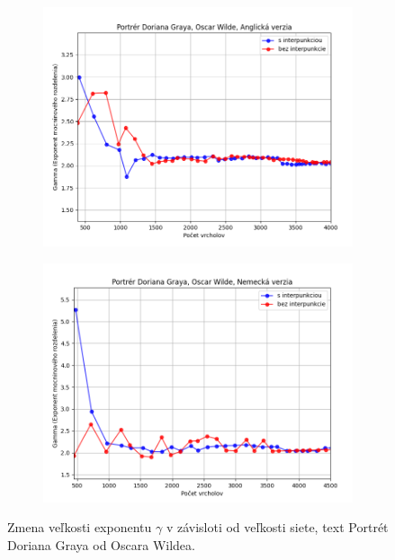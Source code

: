 \begin{figure}[htbp]
    \centering
    \begin{subfigure}[b]{0.9\textwidth}
        \includegraphics[width=\textwidth]{images/Growth/Screenshot_15.png}
    \end{subfigure}

    \vspace{0.3cm}

    \begin{subfigure}[b]{0.9\textwidth}
        \includegraphics[width=\textwidth]{images/Growth/Screenshot_16.png}
    \end{subfigure}
    
    \vspace{0.3cm}
    \caption{Zmena veľkosti exponentu $\gamma$ v závisloti od veľkosti siete, text Portrét Doriana Graya od Oscara Wildea.}\label{fig:growthDorian}
\end{figure}

